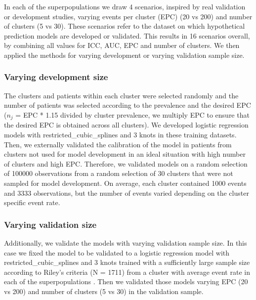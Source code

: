 In each of the superpopulations we draw 4 scenarios, inspired by real validation or development studies, varying events per cluster (\gls{EPC}) (20 vs 200) and number of clusters (5 vs 30). These scenarios refer to the dataset on which hypothetical prediction models are developed or validated. This results in 16 scenarios overall, by combining all values for \gls{ICC}, \gls{AUC}, \gls{EPC} and number of clusters. We then applied the methods for varying development or varying validation sample size.

\subsubsection{Varying development size}
The clusters and patients within each cluster were selected randomly and the number of patients was selected according to the prevalence and the desired \gls{EPC} (\(n_{j}\) = \gls{EPC} * 1.15 divided by cluster prevalence, we multiply \gls{EPC} to ensure that the desired \gls{EPC} is obtained across all clusters). We developed logistic regression models with \gls{restricted_cubic_splines} and 3 knots in these training datasets. Then, we externally validated the calibration of the model in patients from clusters not used for model development in an ideal situation with high number of clusters and high \gls{EPC}. Therefore, we validated models on a random selection of 100000 observations from a random selection of 30 clusters that were not sampled for model development. On average, each cluster contained 1000 events and 3333 observations, but the number of events varied depending on the cluster specific event rate.

\subsubsection{Varying validation size}
Additionally, we validate the models with varying validation sample size. In this case we fixed the model to be validated to a logistic regression model with \gls{restricted_cubic_splines} and 3 knots trained with a sufficiently large sample size according to Riley's criteria (N = 1711) from a cluster with average event rate in each of the superpopulations \cite{rileyMinimumSampleSize2021}. Then we validated those models varying \gls{EPC} (20 vs 200) and number of clusters (5 vs 30) in the validation sample.


